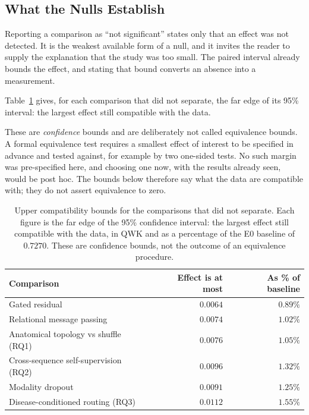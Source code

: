 \documentclass[12pt,a4paper]{report}
\begin{document}
\subsection{What the Nulls Establish}
\label{sec:results-equivalence}

Reporting a comparison as \enquote{not significant} states only that an effect
was not detected. It is the weakest available form of a null, and it invites the
reader to supply the explanation that the study was too small. The paired
interval already bounds the effect, and stating that bound converts an absence
into a measurement.

Table~\ref{tab:bounds} gives, for each comparison that did not separate, the far
edge of its 95\% interval: the largest effect still compatible with the data.

These are \emph{confidence} bounds and are deliberately not called equivalence
bounds. A formal equivalence test requires a smallest effect of interest to be
specified in advance and tested against, for example by two one-sided tests.
No such margin was pre-specified here, and choosing one now, with the results
already seen, would be post hoc. The bounds below therefore say what the data
are compatible with; they do not assert equivalence to zero.

\begin{table}[htbp]
\centering
\caption{Upper compatibility bounds for the comparisons that did not
separate. Each figure is the far edge of the 95\% confidence interval: the
largest effect still compatible with the data, in QWK and as a percentage
of the E0 baseline of $0.7270$. These are confidence bounds, not the
outcome of an equivalence procedure.}
\label{tab:bounds}
\begin{tabular}{lrr}
\toprule
Comparison & Effect is at most & As \% of baseline \\
\midrule
Gated residual & $0.0064$ & $0.89\%$ \\
Relational message passing & $0.0074$ & $1.02\%$ \\
Anatomical topology vs shuffle (RQ1) & $0.0076$ & $1.05\%$ \\
Cross-sequence self-supervision (RQ2) & $0.0096$ & $1.32\%$ \\
Modality dropout & $0.0091$ & $1.25\%$ \\
Disease-conditioned routing (RQ3) & $0.0112$ & $1.55\%$ \\
\bottomrule
\end{tabular}
\end{table}
\end{document}
